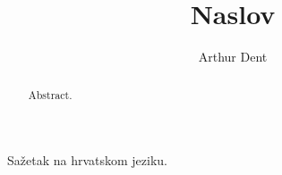 \documentclass[times, utf8, zavrsni]{fer}
\begin{document}

\title{Naslov}

\author{Arthur Dent}

\maketitle

\izvornik

\zahvala{}

\tableofcontents








\appendix


\begin{sazetak}
Sažetak na hrvatskom jeziku.

\end{sazetak}

\begin{abstract}
Abstract.

\end{abstract}
\end{document}

